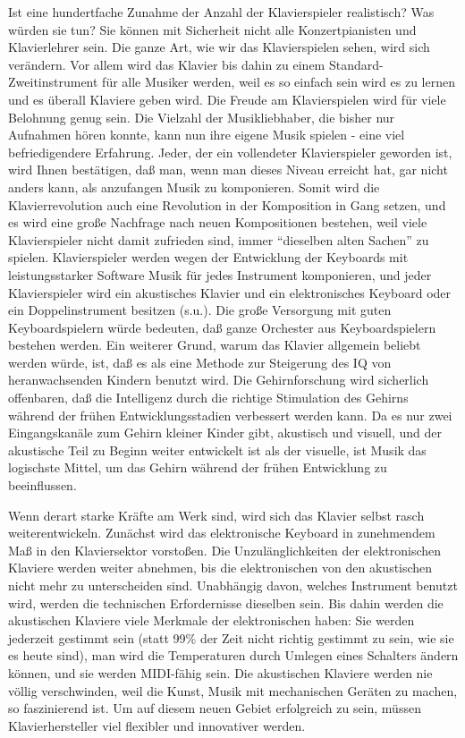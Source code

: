 Ist eine hundertfache Zunahme der Anzahl der Klavierspieler realistisch?
Was würden sie tun?
Sie können mit Sicherheit nicht alle Konzertpianisten und Klavierlehrer sein.
Die ganze Art, wie wir das Klavierspielen sehen, wird sich verändern.
Vor allem wird das Klavier bis dahin zu einem Standard-Zweitinstrument für alle Musiker werden, weil es so einfach sein wird es zu lernen und es überall Klaviere geben wird.
Die Freude am Klavierspielen wird für viele Belohnung genug sein.
Die Vielzahl der Musikliebhaber, die bisher nur Aufnahmen hören konnte, kann nun ihre eigene Musik spielen - eine viel befriedigendere Erfahrung.
Jeder, der ein vollendeter Klavierspieler geworden ist, wird Ihnen bestätigen, daß man, wenn man dieses Niveau erreicht hat, gar nicht anders kann, als anzufangen Musik zu komponieren.
Somit wird die Klavierrevolution auch eine Revolution in der Komposition in Gang setzen, und es wird eine große Nachfrage nach neuen Kompositionen bestehen, weil viele Klavierspieler nicht damit zufrieden sind, immer \enquote{dieselben alten Sachen} zu spielen.
Klavierspieler werden wegen der Entwicklung der Keyboards mit leistungsstarker Software Musik für jedes Instrument komponieren, und jeder Klavierspieler wird ein akustisches Klavier und ein elektronisches Keyboard oder ein Doppelinstrument besitzen (s.u.).
Die große Versorgung mit guten Keyboardspielern würde bedeuten, daß ganze Orchester aus Keyboardspielern bestehen werden.
Ein weiterer Grund, warum das Klavier allgemein beliebt werden würde, ist, daß es als eine Methode zur Steigerung des IQ von heranwachsenden Kindern benutzt wird.
Die Gehirnforschung wird sicherlich offenbaren, daß die Intelligenz durch die richtige Stimulation des Gehirns während der frühen Entwicklungsstadien verbessert werden kann.
Da es nur zwei Eingangskanäle zum Gehirn kleiner Kinder gibt, akustisch und visuell, und der akustische Teil zu Beginn weiter entwickelt ist als der visuelle, ist Musik das logischste Mittel, um das Gehirn während der frühen Entwicklung zu beeinflussen.

Wenn derart starke Kräfte am Werk sind, wird sich das Klavier selbst rasch weiterentwickeln.
Zunächst wird das elektronische Keyboard in zunehmendem Maß in den Klaviersektor vorstoßen.
Die Unzulänglichkeiten der elektronischen Klaviere werden weiter abnehmen, bis die elektronischen von den akustischen nicht mehr zu unterscheiden sind.
Unabhängig davon, welches Instrument benutzt wird, werden die technischen Erfordernisse dieselben sein.
Bis dahin werden die akustischen Klaviere viele Merkmale der elektronischen haben: Sie werden jederzeit gestimmt sein (statt 99\% der Zeit nicht richtig gestimmt zu sein, wie sie es heute sind), man wird die Temperaturen durch Umlegen eines Schalters ändern können, und sie werden MIDI-fähig sein.
Die akustischen Klaviere werden nie völlig verschwinden, weil die Kunst, Musik mit mechanischen Geräten zu machen, so faszinierend ist.
Um auf diesem neuen Gebiet erfolgreich zu sein, müssen Klavierhersteller viel flexibler und innovativer werden.

